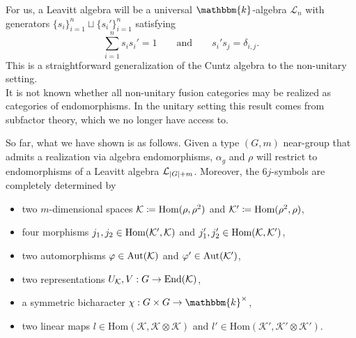 \documentclass{beamer}
\DeclarePairedDelimiter{\abs}{\lvert}{\rvert}
\newcommand{\homset}{\mathrm{Hom}}
\begin{document}
\begin{frame}
For us, a \textcolor{structure}{Leavitt algebra} will be a universal $\mathbbm{k}$-algebra $\mathcal{L}_n$ with generators $\{s_i\}_{i=1}^n \sqcup \{s_i'\}_{i=1}^n$ satisfying
\[
\sum_{i=1}^n s_is_i' = 1\qquad\text{and}\qquad s_i's_j = \delta_{i,j}.
\]
This is a straightforward generalization of the Cuntz algebra to the non-unitary setting.\pause\\[2ex]

It is \textcolor{structure}{not known} whether all non-unitary fusion categories may be realized as categories of endomorphisms. In the unitary setting this result comes from subfactor theory, which we no longer have access to.
\end{frame}

\begin{frame}
So far, what we have shown is as follows. Given a type $(G, m)$ near-group that admits a realization via algebra endomorphisms, $\alpha_g$ and $\rho$ will restrict to endomorphisms of a Leavitt algebra $\mathcal{L}_{\abs{G}+m}$. Moreover, the $6j$-symbols are completely determined by\\[1.5ex]
\begin{itemize}
\item two $m$-dimensional spaces $\mathcal{K} \coloneqq \textup{Hom}(\rho, \rho^2)$ \textcolor{structure}{and $\mathcal{K}' \coloneqq \textup{Hom}(\rho^2, \rho)$},\\[2ex]
\item four morphisms $j_1, j_2 \in \textup{Hom}(\mathcal{K}', \mathcal{K})$ \textcolor{structure}{and $j_1', j_2' \in \textup{Hom}(\mathcal{K}, \mathcal{K}')$},\\[2ex]
\item \textcolor{structure}{two automorphisms $\varphi \in \textup{Aut}(\mathcal{K})$ and $\varphi' \in \textup{Aut}(\mathcal{K}')$},\\[2ex]
\item two representations $U_\mathcal{K}, V : G \to \textup{End}(\mathcal{K})$,\\[2ex]
\item a symmetric bicharacter $\chi : G \times G \to \mathbbm{k}^\times$,\\[2ex]
\item two linear maps $l \in \homset(\mathcal{K}, \mathcal{K} \otimes \mathcal{K})$ \textcolor{structure}{and $l' \in \homset(\mathcal{K}', \mathcal{K}' \otimes \mathcal{K}')$}.
\end{itemize}
\end{frame}
\end{document}
